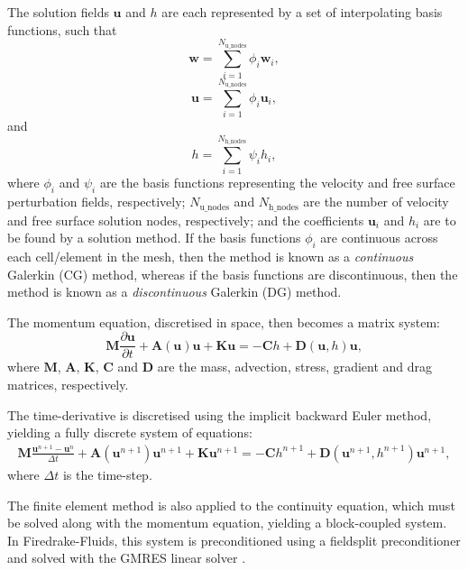 \documentclass[a4paper,11pt]{report}
\begin{document}
The solution fields $\mathbf{u}$ and $h$ are each represented by a set of interpolating basis functions, such that
\begin{equation}
   \mathbf{w} = \sum_{i=1}^{N_\mathrm{u\_nodes}} \phi_i\mathbf{w}_i,
\end{equation}
\begin{equation}
   \mathbf{u} = \sum_{i=1}^{N_\mathrm{u\_nodes}} \phi_i\mathbf{u}_i,
\end{equation}
and
\begin{equation}
   h = \sum_{i=1}^{N_\mathrm{h\_nodes}} \psi_ih_i,
\end{equation}
where $\phi_i$ and $\psi_i$ are the basis functions representing the velocity and free surface perturbation fields, respectively; $N_\mathrm{u\_nodes}$ and $N_\mathrm{h\_nodes}$ are the number of velocity and free surface solution nodes, respectively; and the coefficients $\mathbf{u}_i$ and $h_i$ are to be found by a solution method. If the basis functions $\phi_i$ are continuous across each cell/element in the mesh, then the method is known as a \textit{continuous} Galerkin (CG) method, whereas if the basis functions are discontinuous, then the method is known as a \textit{discontinuous} Galerkin (DG) method.

The momentum equation, discretised in space, then becomes a matrix system:
\begin{equation}
   \mathbf{M}\frac{\partial\mathbf{u}}{\partial t} + \mathbf{A}(\mathbf{u})\mathbf{u} + \mathbf{K}\mathbf{u} = -\mathbf{C}h + \mathbf{D}(\mathbf{u}, h)\mathbf{u},
\end{equation}
where $\mathbf{M}$, $\mathbf{A}$, $\mathbf{K}$, $\mathbf{C}$ and $\mathbf{D}$ are the mass, advection, stress, gradient and drag matrices, respectively.

The time-derivative is discretised using the implicit backward Euler method, yielding a fully discrete system of equations:
\begin{eqnarray}
   \mathbf{M}\frac{\mathbf{u}^{n+1} - \mathbf{u}^{n}}{\Delta t} + \mathbf{A}(\mathbf{u}^{n+1})\mathbf{u}^{n+1} + \mathbf{K}\mathbf{u}^{n+1} = -\mathbf{C}h^{n+1} + \mathbf{D}(\mathbf{u}^{n+1}, h^{n+1})\mathbf{u}^{n+1},
\end{eqnarray}
where $\Delta t$ is the time-step.

The finite element method is also applied to the continuity equation, which must be solved along with the momentum equation, yielding a block-coupled system. In Firedrake-Fluids, this system is preconditioned using a fieldsplit preconditioner \citep{Brown_etal_2012} and solved with the GMRES linear solver \citep{SaadSchultz_1986}.
\end{document}
